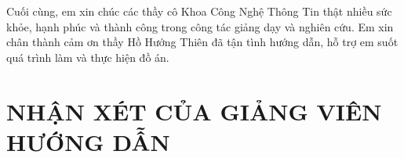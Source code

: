 \documentclass[12pt,a4paper]{report}
\begin{document}
\vspace{\baselineskip}
\noindent
Cuối cùng, em xin chúc các thầy cô Khoa Công Nghệ Thông Tin thật nhiều sức khỏe, hạnh phúc và thành công trong công tác giảng dạy và nghiên cứu. Em xin chân thành cảm ơn thầy Hồ Hướng Thiên đã tận tình hướng dẫn,
hỗ trợ em suốt quá trình làm và thực hiện đồ án.


\chapter*{NHẬN XÉT CỦA GIẢNG VIÊN HƯỚNG DẪN}
\vspace{8cm}

\tableofcontents
\listoffigures
\listoftables
\renewcommand{\listlistingname}{DANH MỤC ĐOẠN MÃ NGUỒN}
\listoflistings
{}
\end{document}
